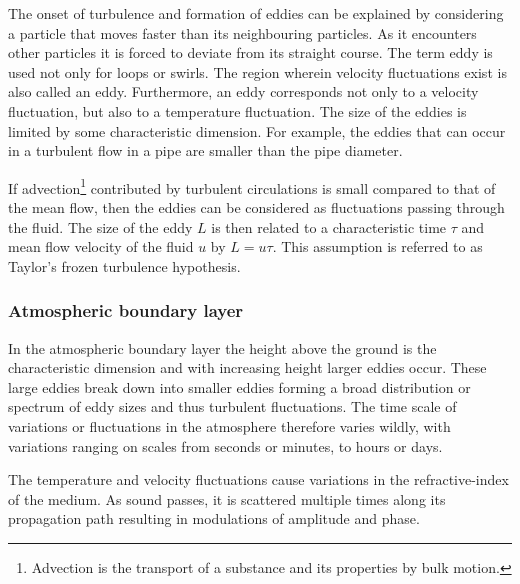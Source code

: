 The onset of turbulence and formation of eddies can be explained by considering
a particle that moves faster than its neighbouring particles. As it encounters
other particles it is forced to deviate from its straight course. The term eddy
is used not only for loops or swirls. The region wherein velocity fluctuations
exist is also called an eddy. Furthermore, an eddy corresponds not only to a velocity
fluctuation, but also to a temperature fluctuation.
The size of the eddies is limited by some characteristic dimension. For example,
the eddies that can occur in a turbulent flow in a pipe are smaller than the
pipe diameter.

If advection\footnote{Advection is the transport of a substance and its properties by bulk motion.} contributed by turbulent circulations is small compared to that of
the mean flow, then the eddies can be considered as  fluctuations
passing through the fluid. The size of the eddy $L$ is then related to a
characteristic time $\tau$ and mean flow velocity of the fluid $u$ by $L = u
\tau$. This assumption is referred to as Taylor's frozen turbulence hypothesis.

\subsubsection*{Atmospheric boundary layer}
In the atmospheric boundary layer the height above the ground is the
characteristic dimension and with increasing height larger eddies occur. These
large eddies break down into smaller eddies forming a broad distribution or
spectrum of eddy sizes and thus turbulent fluctuations. The time scale of
variations or fluctuations in the atmosphere therefore varies wildly, with
variations ranging on scales from seconds or minutes, to hours or days.

The temperature and velocity fluctuations cause variations in the
refractive-index of the medium. As sound passes, it is scattered multiple times
along its propagation path resulting in modulations of amplitude and phase.

